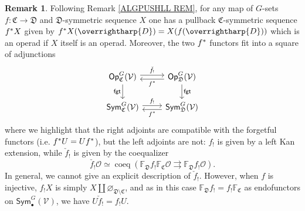 \documentclass[a4paper,10pt
,draft
]{article}%
\numberwithin{equation}{section}
\numberwithin{figure}{section}
\theoremstyle{definition} %
\newtheorem{remark}[equation]{Remark}%
\newcommand{\vect}[1]{\text{\overrightharp{\ensuremath{#1}}}}
\newcommand{\Sym}{\ensuremath{\mathsf{Sym}}}%
\newcommand{\Op}{\mathsf{Op}}%
\newcommand{\V}{\ensuremath{\mathcal V}}
\renewcommand{\O}{\ensuremath{\mathcal O}}
\newcommand{\1}{\ensuremath{\mathbbm 1}}%
\begin{document}
\begin{remark}\label{OP_MAP REM}
      Following Remark \ref{ALGPUSHLL REM},
      for any map of $G$-sets $f \colon \mathfrak C \to \mathfrak D$
      and $\mathfrak D$-symmetric sequence $X$
      one has a pullback $\mathfrak C$-symmetric sequence $f^{\**}X$
      given by
      $ f^{\**}X(\vect D) = X(f(\vect D))$
      which is an operad if $X$ itself is an operad.
      Moreover, the two $f^{\**}$ functors fit into a square of adjunctions 
      \begin{equation}\label{GC_CHANGE_EQ}
            \begin{tikzcd}
                  \Op^G_{\mathfrak C}(\V) 
                  \arrow[shift left]{r}{\check{f}_!}
                  \arrow[d, "\mathsf{fgt}"']
                  &
                  \Op^G_{\mathfrak D}(\V) 
                  \arrow[shift left]{l}{f^{\**}}
                  \arrow[d, "\mathsf{fgt}"]
                  \\
                  \Sym^G_{\mathfrak C}(\V) 
                  \arrow[shift left]{r}{f_!}
                  &
                  \Sym^G_{\mathfrak D}(\V) 
                  \arrow[shift left]{l}{f^{\**}}
            \end{tikzcd}
      \end{equation}
      where we highlight that
      the right adjoints are compatible with the forgetful functors (i.e. $f^{\**}U = U f^{\**}$), but the left adjoints are not:
      $f_!$ is given by a left Kan extension, while $\check{f}_!$ is given by the coequalizer
      \begin{equation}
            \label{CFS_EQ}
            \check{f_!} \O \simeq \mathop{coeq}(\mathbb F_{\mathfrak D} f_! \mathbb F_{\mathfrak C}\O \rightrightarrows \mathbb F_{\mathfrak D} f_! \O).
      \end{equation}
      In general, we cannot give an explicit description of $\check f_!$.
      However, when $f$ is injective, $f_!X$ is simply $X \amalg \varnothing_{\mathfrak D \setminus \mathfrak C}$,
      and as in this case $\mathbb F_{\mathfrak D} f_! = f_! \mathbb F_{\mathfrak C}$ as endofunctors on $\Sym^G_\bullet(\V)$,
      we have $U \check f_! = f_! U$.
\end{remark}
\end{document}
